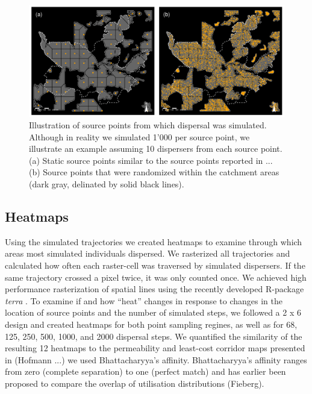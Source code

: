 \documentclass[abstract=on,10pt,a4paper,bibliography=totocnumbered]{article}
\begin{document}
\begin{figure}[htbp]
  \begin{center}
    \includegraphics[width = \textwidth]{99_SourcePoints}
    \caption{Illustration of source points from which dispersal was simulated.
    Although in reality we simulated 1'000 per source point, we illustrate an
    example assuming 10 dispersers from each source point. (a) Static source
    points similar to the source points reported in ... (b) Source points that
    were randomized within the catchment areas (dark gray, delinated by solid
    black lines).}
    \label{SourcePoints}
  \end{center}
\end{figure}

\subsection{Heatmaps}
Using the simulated trajectories we created heatmaps to examine through which
areas most simulated individuals dispersed. We rasterized all trajectories and
calculated how often each raster-cell was traversed by simulated dispersers. If
the same trajectory crossed a pixel twice, it was only counted once. We achieved
high performance rasterization of spatial lines using the recently developed
R-package \textit{terra} \citep{Hijmans.2020}. To examine if and how ``heat''
changes in response to changes in the location of source points and the number
of simulated steps, we followed a 2 x 6 design and created heatmaps for both
point sampling regines, as well as for 68, 125, 250, 500, 1000, and 2000
dispersal steps. We quantified the similarity of the resulting 12 heatmaps to
the permeability and least-cost corridor maps presented in (Hofmann ...) we used
Bhattacharyya's affinity. Bhattacharyya's affinity ranges from zero (complete
separation) to one (perfect match) and has earlier been proposed to compare the
overlap of utilisation distributions (Fieberg).
\end{document}
